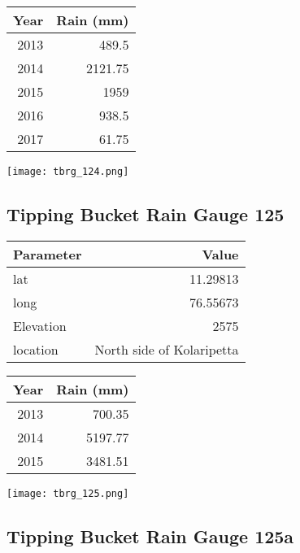 \documentclass[a4paper]{article}
\begin{document}
\begin{center}
\begin{tabular}{rr}
Year & Rain (mm)\\
\hline
2013 & 489.5\\
2014 & 2121.75\\
2015 & 1959\\
2016 & 938.5\\
2017 & 61.75\\
\end{tabular}
\end{center}

\begin{center}
\texttt{[image: tbrg\_124.png]}
\end{center}

\newpage

\subsection*{Tipping Bucket Rain Gauge 125}
\label{sec:orgf6cf875}

\begin{center}
\begin{tabular}{lr}
Parameter & Value\\
\hline
lat & 11.29813\\
long & 76.55673\\
Elevation & 2575\\
location & North side of Kolaripetta\\
\end{tabular}
\end{center}

\begin{center}
\begin{tabular}{rr}
Year & Rain (mm)\\
\hline
2013 & 700.35\\
2014 & 5197.77\\
2015 & 3481.51\\
\end{tabular}
\end{center}

\begin{center}
\texttt{[image: tbrg\_125.png]}
\end{center}

\newpage

\subsection*{Tipping Bucket Rain Gauge 125a}
\label{sec:orga6a9c4b}
\end{document}

